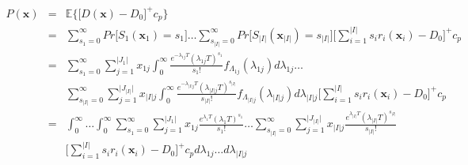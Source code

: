 \documentclass[preprint,12pt]{elsarticle}
\begin{document}
\small{
\begin{eqnarray}
P(\boldsymbol{x})& = & \mathbb{E}\bigg\{\bigg[D(\boldsymbol{x})-D_{0}\bigg]^{+} c_{p} \bigg\} \nonumber\\
&=&\sum_{s_{1}=0}^{\infty}{Pr\bigg[S_{1}(\boldsymbol{x}_{1})=s_{1}\bigg]}\dots\sum_{s_{\rvert I \lvert}=0}^{\infty}{Pr\bigg[S_{\rvert I \lvert}(\boldsymbol{x}_{\rvert I \lvert})=s_{\rvert I \lvert}\bigg]} \bigg[\sum_{i=1}^{\rvert I \lvert}{s_{i}r_{i}(\boldsymbol{x}_{i})}-D_{0}\bigg]^{+}c_{p} \nonumber\\
&=& \sum^{\infty}_{s_{1}=0}\sum^{\rvert J_{1} \lvert}_{j=1}{x_{1j}}\int^{\infty}_{0}{\frac{e^{-\lambda_{1j}T}(\lambda_{1j}T)^{s_{1}}}{s_{1}!}f_{\Lambda_{1j}}(\lambda_{1j})d\lambda_{1j}}\dots \nonumber\\
&&\sum^{\infty}_{s_{\rvert I \lvert}=0}\sum^{\rvert J_{\rvert I \lvert} \lvert}_{j=1}{x_{\rvert I \lvert j}}\int^{\infty}_{0}{\frac{e^{-\lambda_{\rvert I \lvert j}T}(\lambda_{\rvert I \lvert j}T)^{s_{\rvert I \lvert}}}{s_{\rvert I \lvert}!}f_{\Lambda_{\rvert I \lvert j}}(\lambda_{\rvert I \lvert j})d\lambda_{\rvert I \lvert j}}\bigg[\sum_{i=1}^{\rvert I \lvert}{s_{i}r_{i}(\boldsymbol{x}_{i})}-D_{0}\bigg]^{+}c_{p} \nonumber\\
&=&\int^{\infty}_{0}\dots\int^{\infty}_{0}{\sum_{s_{1}=0}^{\infty}\sum^{\rvert J_{1} \lvert}_{j=1}{x_{1j}\frac{e^{\lambda_{1}T}(\lambda_{1}T)^{s_{1}}}{s_{1}!}\dots \sum_{s_{\rvert I \lvert}=0}^{\infty}\sum^{\rvert J_{\rvert I \lvert} \lvert}_{j=1}{x_{\rvert I \lvert j}\frac{e^{\lambda_{\rvert I \lvert}T}(\lambda_{\rvert I \lvert}T)^{s_{\rvert I \lvert}}}{s_{\rvert I \lvert}!}}}}\nonumber\\
&&\bigg[\sum_{i=1}^{\rvert I \lvert}{s_{i}r_{i}(\boldsymbol{x}_{i})}-D_{0}\bigg]^{+}c_{p}d\lambda_{1j}\dots d\lambda_{\rvert I \lvert j}
\label{penaltycost}
\end{eqnarray}
}
\end{document}
